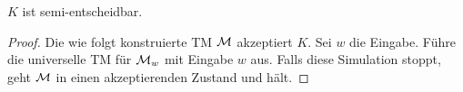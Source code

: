 \begin{lemma}[name={[$K$ ist semi-entscheidbar]}]\label{lemma:Ksemi-entscheidbar}
	$K$ ist semi-entscheidbar.
\end{lemma}
\begin{proof}
  Die wie folgt konstruierte \ac{TM} $\mathcal{M}$ akzeptiert $K$.
  Sei $w$ die Eingabe. 
  Führe die universelle \ac{TM} für $\mathcal{M}_w$ mit Eingabe $w$ aus.
  Falls diese Simulation stoppt, geht $\mathcal{M}$ in einen akzeptierenden Zustand und hält.
\end{proof}
